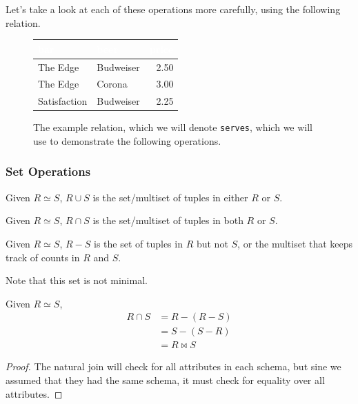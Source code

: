     Let's take a look at each of these operations more carefully, using the following relation. 

    \begin{figure}[H]
      \centering
      \begin{tabular}{|l|l|r|}
      \hline
      \rowcolor[HTML]{E26B0A} 
      \textcolor{white}{\textbf{bar}} & \textcolor{white}{\textbf{beer}} & \textcolor{white}{\textbf{price}} \\ \hline
      \rowcolor[HTML]{FBCEB1}
      The Edge & Budweiser & 2.50 \\ \hline
      \rowcolor[HTML]{FBCEB1}
      The Edge & Corona & 3.00 \\ \hline
      \rowcolor[HTML]{FBCEB1}
      Satisfaction & Budweiser & 2.25 \\ \hline
      \end{tabular}
      \caption{The example relation, which we will denote \texttt{serves}, which we will use to demonstrate the following operations.} 
      \label{fig:serves}
    \end{figure} 

  \subsubsection{Set Operations}

    \begin{definition}[Union]
      \label{def:union}
      Given $R \simeq S$, $R \cup S$ is the set/multiset of tuples in either $R$ or $S$. 
    \end{definition}

    \begin{definition}[Intersection]
      \label{def:intersection}
      Given $R \simeq S$, $R \cap S$ is the set/multiset of tuples in both $R$ or $S$. 
    \end{definition}

    \begin{definition}[Difference]
      \label{def:difference}
      Given $R \simeq S$, $R - S$ is the set of tuples in $R$ but not $S$, or the multiset that keeps track of counts in $R$ and $S$. 
    \end{definition}

    Note that this set is not minimal. 

    \begin{lemma}
      \label{thm:intersection-in-terms-of-difference-and-join}
 
      Given $R \simeq S$, 
      \begin{align}
        R \cap S  & = R - (R - S) \\ 
                  & = S - (S - R) \\ 
                  & = R \bowtie S
      \end{align}
    \end{lemma}
    \begin{proof}
      The natural join will check for all attributes in each schema, but sine we assumed that they had the same schema, it must check for equality over all attributes.
    \end{proof}

